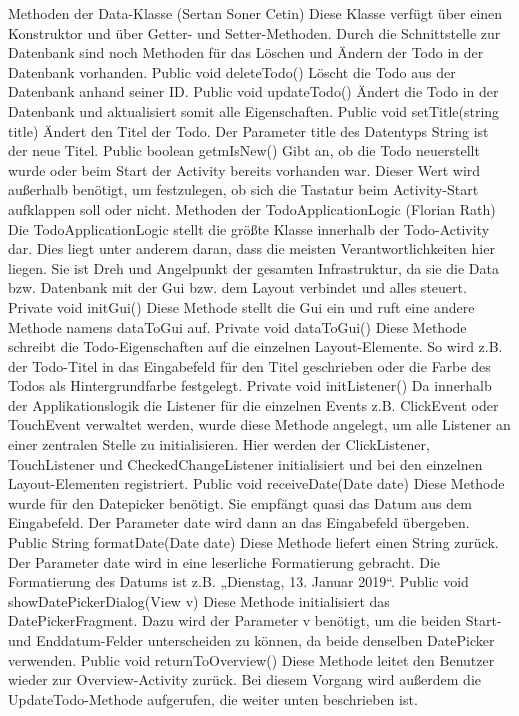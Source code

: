 Methoden der Data-Klasse (Sertan Soner Cetin)
Diese Klasse verfügt über einen Konstruktor und über Getter- und Setter-Methoden. Durch die Schnittstelle zur Datenbank sind noch Methoden für das Löschen und Ändern der Todo in der Datenbank vorhanden.
Public void deleteTodo()
	Löscht die Todo aus der Datenbank anhand seiner ID.
Public void updateTodo()
	Ändert die Todo in der Datenbank und aktualisiert somit alle Eigenschaften.
Public void setTitle(string title)
Ändert den Titel der Todo. Der Parameter title des Datentyps String ist der neue Titel.
Public boolean getmIsNew()
Gibt an, ob die Todo neuerstellt wurde oder beim Start der Activity bereits vorhanden war. Dieser Wert wird außerhalb benötigt, um festzulegen, ob sich die Tastatur beim Activity-Start aufklappen soll oder nicht.
Methoden der TodoApplicationLogic (Florian Rath)
Die TodoApplicationLogic stellt die größte Klasse innerhalb der Todo-Activity dar. Dies liegt unter anderem daran, dass die meisten Verantwortlichkeiten hier liegen. Sie ist Dreh und Angelpunkt der gesamten Infrastruktur, da sie die Data bzw. Datenbank mit der Gui bzw. dem Layout verbindet und alles steuert.
Private void initGui()
Diese Methode stellt die Gui ein und ruft eine andere Methode namens dataToGui auf.
Private void dataToGui()
Diese Methode schreibt die Todo-Eigenschaften auf die einzelnen Layout-Elemente. So wird z.B. der Todo-Titel in das Eingabefeld für den Titel geschrieben oder die Farbe des Todos als Hintergrundfarbe festgelegt.
Private void initListener()
Da innerhalb der Applikationslogik die Listener für die einzelnen Events z.B. ClickEvent oder TouchEvent verwaltet werden, wurde diese Methode angelegt, um alle Listener an einer zentralen Stelle zu initialisieren. Hier werden der ClickListener, TouchListener und CheckedChangeListener initialisiert und bei den einzelnen Layout-Elementen registriert.
Public void receiveDate(Date date)
Diese Methode wurde für den Datepicker benötigt. Sie empfängt quasi das Datum aus dem Eingabefeld. Der Parameter date wird dann an das Eingabefeld übergeben.
Public String formatDate(Date date)
Diese Methode liefert einen String zurück. Der Parameter date wird in eine leserliche Formatierung gebracht. Die Formatierung des Datums ist z.B. „Dienstag, 13. Januar 2019“.
Public void showDatePickerDialog(View v)
Diese Methode initialisiert das DatePickerFragment. Dazu wird der Parameter v benötigt, um die beiden Start- und Enddatum-Felder unterscheiden zu können, da beide denselben DatePicker verwenden.
Public void returnToOverview()
Diese Methode leitet den Benutzer wieder zur Overview-Activity zurück. Bei diesem Vorgang wird außerdem die UpdateTodo-Methode aufgerufen, die weiter unten beschrieben ist.

